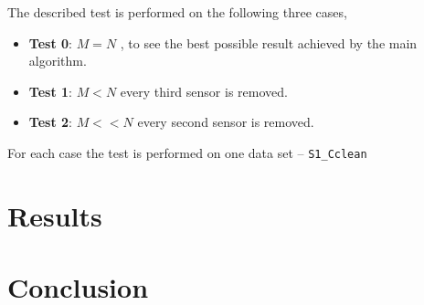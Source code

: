 The described test is performed on the following three cases,
\begin{itemize}
\item \textbf{Test 0}: $M = N$ , to see the best possible result achieved by the main algorithm. 
\item \textbf{Test 1}: $M < N$ every third sensor is removed. 
\item \textbf{Test 2}: $M << N$ every second sensor is removed.
\end{itemize}
For each case the test is performed on one data set -- \texttt{S1\_Cclean} 

\section{Results}




\section{Conclusion}